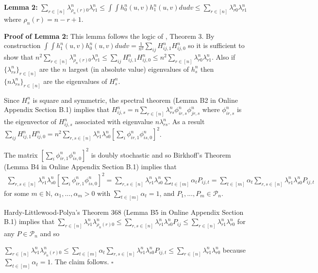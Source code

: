 \documentclass[12pt]{article}
\theoremstyle{definition}
\begin{document}
\begin{flushleft}
\textbf{Lemma 2:} $ \sum_{r \in [n]}\lambda^{n}_{\rho_{n}(r)0}\lambda^{n}_{r1} \leq \int\int h^{n}_{0}(u,v)h^{n}_{1}(u,v)dudv \leq \sum_{r \in [n]}\lambda^{n}_{r0}\lambda^{n}_{r1}$ where $\rho_{n}(r) = n-r+1$. 
\end{flushleft}

\begin{flushleft}
\textbf{Proof of Lemma 2:} This lemma follows the logic of \cite{finke1987quadratic}, Theorem 3. By construction $\int\int h^{n}_{1}(u,v)h^{n}_{0}(u,v)dudv = \frac{1}{n^{2}}\sum_{ij}H_{ij,1}^{n}H_{ij,0}^{n}$ so it is sufficient to show that $n^2\sum_{r \in [n]}\lambda^{n}_{\rho_{n}(r)0}\lambda^{n}_{r1} \leq \sum_{ij} H^{n}_{ij,1}H^{n}_{ij,0} \leq n^2\sum_{r \in [n]}\lambda^{n}_{r0}\lambda^{n}_{r1}$. Also if  $\{\lambda_{rs}^{n}\}_{r \in [n]}$ are the $n$ largest (in absolute value) eigenvalues of $h_{s}^{n}$  then $\{n\lambda_{rs}^{n}\}_{r \in [n]}$ are the eigenvalues of $H_{s}^{n}$.  \newline

Since $H^{n}_{s}$ is square and symmetric, the spectral theorem (Lemma B2 in Online Appendix Section B.1) implies that $H_{ij,s}^{n} = n\sum_{r \in [n]}\lambda_{rs}^{n}\phi_{ir,s}^{n}\phi_{jr,s}^{n}$ where $\phi_{ir,s}^{n}$ is the eigenvector of $H_{ij,s}^{n}$ associated with eigenvalue $n\lambda_{rs}^{n}$. As a result $\sum_{ij}H_{ij,1}^{n}H_{ij,0}^{n} = n^2\sum_{r,s \in [n]}\lambda_{r1}^{n}\lambda_{s0}^{n}\left[\sum_{i}\phi_{ir,1}^{n}\phi_{is,0}^{n}\right]^{2}$. \newline

The matrix $\left[\sum_{i}\phi_{ir,1}^{n}\phi_{is,0}^{n}\right]^{2}$ is doubly stochastic and so Birkhoff's Theorem (Lemma B4 in Online Appendix Section B.1)  implies that 
\begin{align*}
\sum_{r,s \in [n]}\lambda_{r1}^{n}\lambda_{s0}^{n}\left[\sum_{i}\phi_{ir,1}^{n}\phi_{is,0}^{n}\right]^{2} 
 =  \sum_{r,s \in [n]}\lambda_{r1}^{n}\lambda_{s0}^{n}\sum_{t\in[m]}\alpha_{t}P_{ij,t} 
 =  \sum_{t\in[m]}\alpha_{t}\sum_{r,s \in [n]}\lambda_{r1}^{n}\lambda_{s0}^{n}P_{ij,t}
 \end{align*}
 for some $m \in \mathbb{N}$, $\alpha_{1},...,\alpha_{m} > 0$ with $\sum_{t\in[m]}\alpha_{t} = 1$, and $P_{1},...,P_{m} \in \mathcal{P}_{n}$.  \newline
 
 Hardy-Littlewood-Polya's Theorem 368 (Lemma B5 in Online Appendix Section B.1) implies that
$  \sum_{r \in [n]}\lambda_{r1}^{n}\lambda_{\rho_{n}(r)0}^{n} 
  \leq \sum_{r,s \in [n]}\lambda_{r1}^{n}\lambda_{s0}^{n}P_{ij} 
  \leq \sum_{r \in [n]}\lambda_{r1}^{n}\lambda_{r0}^{n}$
   for any $P \in \mathcal{P}_{n}$ and so 

$  \sum_{r \in [n]}\lambda_{r1}^{n}\lambda_{\rho_{n}(r)0}^{n} 
  \leq \sum_{t\in[m]}\alpha_{t}\sum_{r,s \in [n]}\lambda_{r1}^{n}\lambda_{s0}^{n}P_{ij,t}
  \leq \sum_{r \in [n]}\lambda_{r1}^{n}\lambda_{r0}^{n}$
  because $\sum_{t \in [m]}\alpha_{t} = 1$. The claim follows. $\square$
\end{flushleft}
\end{document}
